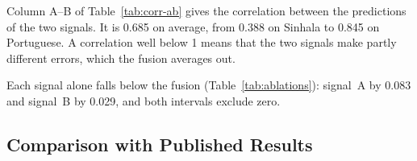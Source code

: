 Column A--B of Table~\ref{tab:corr-ab} gives the correlation between the predictions of the two %
signals. It is 0.685 on average, from 0.388 on Sinhala to 0.845 on Portuguese. A correlation well
below 1 means that the two signals make partly different errors, which the fusion averages out.

Each signal alone falls below the fusion (Table~\ref{tab:ablations}): signal~A %
by 0.083 and signal~B by 0.029, and both intervals exclude zero.

\subsection{Comparison with Published Results}
\label{sec:published}

